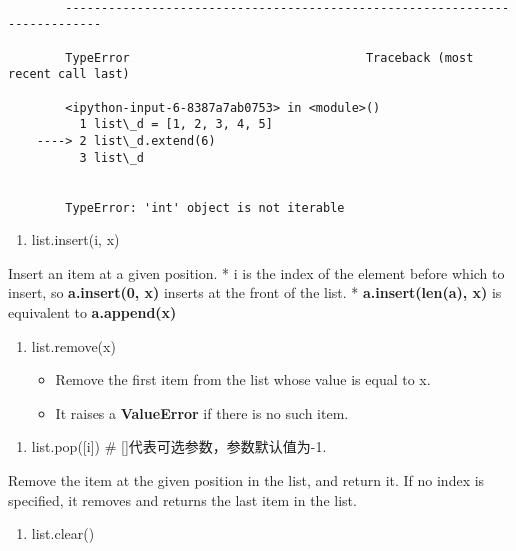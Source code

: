 \documentclass[11pt]{article}
\providecommand{\tightlist}{%
      \setlength{\itemsep}{0pt}\setlength{\parskip}{0pt}}
\begin{document}
    \begin{Verbatim}[commandchars=\\\{\}]

        ---------------------------------------------------------------------------

        TypeError                                 Traceback (most recent call last)

        <ipython-input-6-8387a7ab0753> in <module>()
          1 list\_d = [1, 2, 3, 4, 5]
    ----> 2 list\_d.extend(6)
          3 list\_d
    

        TypeError: 'int' object is not iterable

    \end{Verbatim}

    \begin{enumerate}
\def\labelenumi{\arabic{enumi}.}
\setcounter{enumi}{2}
\tightlist
\item
  list.insert(i, x)
\end{enumerate}

Insert an item at a given position. * i is the index of the element
before which to insert, so \textbf{a.insert(0, x)} inserts at the front
of the list. * \textbf{a.insert(len(a), x)} is equivalent to
\textbf{a.append(x)}

    \begin{enumerate}
\def\labelenumi{\arabic{enumi}.}
\setcounter{enumi}{3}
\item
  list.remove(x)

  \begin{itemize}
  \tightlist
  \item
    Remove the first item from the list whose value is equal to x.
  \item
    It raises a \textbf{ValueError} if there is no such item.
  \end{itemize}
\end{enumerate}

    \begin{enumerate}
\def\labelenumi{\arabic{enumi}.}
\setcounter{enumi}{4}
\tightlist
\item
  list.pop({[}i{]}) \# {[}{]}代表可选参数，参数默认值为-1.
\end{enumerate}

Remove the item at the given position in the list, and return it. If no
index is specified, it removes and returns the last item in the list.

    \begin{enumerate}
\def\labelenumi{\arabic{enumi}.}
\setcounter{enumi}{5}
\tightlist
\item
  list.clear()
\end{enumerate}
\end{document}
